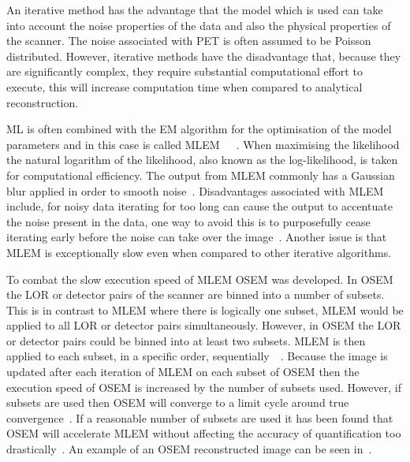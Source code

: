             An iterative method has the advantage that the model which is used can take into account the noise properties of the data and also the physical properties of the scanner. The noise associated with \gls{PET} is often assumed to be Poisson distributed. However, iterative methods have the disadvantage that, because they are significantly complex, they require substantial computational effort to execute, this will increase computation time when compared to analytical reconstruction.
            
            \gls{ML} is often combined with the \gls{EM} algorithm for the optimisation of the model parameters and in this case is called \gls{MLEM}~~~. When maximising the likelihood the natural logarithm of the likelihood, also known as the log-likelihood, is taken for computational efficiency. The output from \gls{MLEM} commonly has a Gaussian blur applied in order to smooth noise~. Disadvantages associated with \gls{MLEM} include, for noisy data iterating for too long can cause the output to accentuate the noise present in the data, one way to avoid this is to purposefully cease iterating early before the noise can take over the image~. Another issue is that \gls{MLEM} is exceptionally slow even when compared to other iterative algorithms. %
            
            To combat the slow execution speed of \gls{MLEM} \gls{OSEM} was developed. In \gls{OSEM} the \gls{LOR} or detector pairs of the scanner are binned into a number of subsets. This is in contrast to \gls{MLEM} where there is logically one subset, \gls{MLEM} would be applied to all \gls{LOR} or detector pairs simultaneously. However, in \gls{OSEM} the \gls{LOR} or detector pairs could be binned into at least two subsets. \gls{MLEM} is then applied to each subset, in a specific order, sequentially~~. Because the image is updated after each iteration of \gls{MLEM} on each subset of \gls{OSEM} then the execution speed of \gls{OSEM} is increased by the number of subsets used. However, if%
            subsets are used %
            then  \gls{OSEM} will converge to a limit cycle around true convergence~. If a reasonable number of subsets are used it has been found that \gls{OSEM} will accelerate \gls{MLEM} without affecting the accuracy of quantification too drastically~. An example of an \gls{OSEM} reconstructed image can be seen in~.
            
